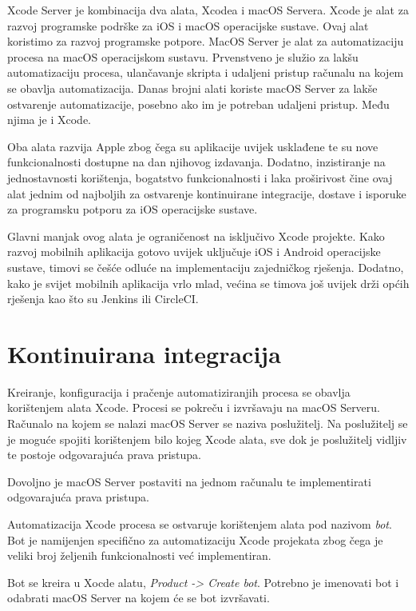 \documentclass[times, utf8, diplomski, numeric]{fer}
\begin{document}
\begin{appendices}
Xcode Server je kombinacija dva alata, Xcodea i macOS Servera. Xcode je alat za razvoj programske podrške za iOS i macOS operacijske sustave. Ovaj alat koristimo za razvoj programske potpore. MacOS Server je alat za automatizaciju procesa na macOS operacijskom sustavu. Prvenstveno je služio za lakšu automatizaciju procesa, ulančavanje skripta i udaljeni pristup računalu na kojem se obavlja automatizacija. Danas brojni alati koriste macOS Server za lakše ostvarenje automatizacije, posebno ako im je potreban udaljeni pristup. Među njima je i Xcode.

Oba alata razvija Apple zbog čega su aplikacije uvijek usklađene te su nove funkcionalnosti dostupne na dan njihovog izdavanja. Dodatno, inzistiranje na jednostavnosti korištenja, bogatstvo funkcionalnosti i laka proširivost čine ovaj alat jednim od najboljih za ostvarenje kontinuirane integracije, dostave i isporuke za programsku potporu za iOS operacijske sustave.

Glavni manjak ovog alata je ograničenost na isključivo Xcode projekte. Kako razvoj mobilnih aplikacija gotovo uvijek uključuje iOS i Android operacijske sustave, timovi se češće odluće na implementaciju zajedničkog rješenja. Dodatno, kako je svijet mobilnih aplikacija vrlo mlad, većina se timova još uvijek drži općih rješenja kao što su Jenkins ili CircleCI.

\section{Kontinuirana integracija}

Kreiranje, konfiguracija i pračenje automatiziranjih procesa se obavlja korištenjem alata Xcode. Procesi se pokreču i izvršavaju na macOS Serveru. Računalo na kojem se nalazi macOS Server se naziva poslužitelj. Na poslužitelj se je moguće spojiti korištenjem bilo kojeg Xcode alata, sve dok je poslužitelj vidljiv te postoje odgovarajuća prava pristupa.

Dovoljno je macOS Server postaviti na jednom računalu te implementirati odgovarajuća prava pristupa.

Automatizacija Xcode procesa se ostvaruje korištenjem alata pod nazivom \textit{bot}. Bot je namijenjen specifično za automatizaciju Xcode projekata zbog čega je veliki broj željenih funkcionalnosti već implementiran.

Bot se kreira u Xocde alatu, \textit{Product -> Create bot}. Potrebno je imenovati bot i odabrati macOS Server na kojem će se bot izvršavati.


\end{appendices}
\end{document}
